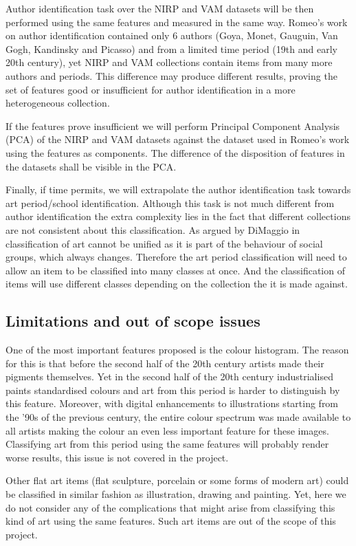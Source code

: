 \documentclass[a4paper]{article}
\begin{document}
Author identification task over the NIRP and VAM datasets will be then
performed using the same features and measured in the same way.  Romeo's work
on author identification contained only 6 authors (Goya, Monet, Gauguin, Van
Gogh, Kandinsky and Picasso) and from a limited time period (19th and early
20th century), yet NIRP and VAM collections contain items from many more
authors and periods.  This difference may produce different results, proving
the set of features good or insufficient for author identification in a more
heterogeneous collection.


If the features prove insufficient we will perform Principal Component Analysis
(PCA) of the NIRP and VAM datasets against the dataset used in Romeo's work
using the features as components.  The difference of the disposition of
features in the datasets shall be visible in the PCA.

Finally, if time permits, we will extrapolate the author identification task
towards art period/school identification.  Although this task is not much
different from author identification the extra complexity lies in the fact that
different collections are not consistent about this classification.  As argued
by DiMaggio in \cite{dimaggio87art} classification of art cannot be unified as
it is part of the behaviour of social groups, which always changes.  Therefore
the art period classification will need to allow an item to be classified into
many classes at once.  And the classification of items will use different
classes depending on the collection the it is made against.

\subsection{Limitations and out of scope issues}

One of the most important features proposed is the colour histogram.  The
reason for this is that before the second half of the 20th century artists made
their pigments themselves.  Yet in the second half of the 20th century
industrialised paints standardised colours and art from this period is harder
to distinguish by this feature.  Moreover, with digital enhancements to
illustrations starting from the '90s of the previous century, the entire colour
spectrum was made available to all artists making the colour an even less
important feature for these images.  Classifying art from this period using the
same features will probably render worse results, this issue is not covered in
the project.

Other flat art items (flat sculpture, porcelain or some forms of modern art)
could be classified in similar fashion as illustration, drawing and painting.
Yet, here we do not consider any of the complications that might arise from
classifying this kind of art using the same features.  Such art items are out
of the scope of this project.



\end{document}
